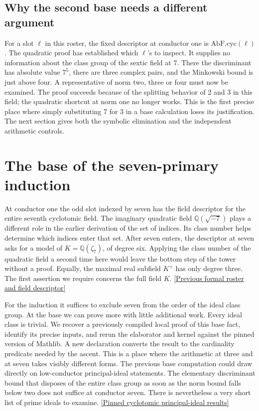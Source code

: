 \documentclass[12pt,letterpaper]{article}
\begin{document}
\subsection{Why the second base needs a different argument}
For a slot \(\ell\) in this roster, the fixed descriptor at conductor one is \(\mathrm{AbF.cyc}(\ell)\). The quadratic proof has established which \(\ell\)'s to inspect. It supplies no information about the class group of the sextic field at 7. There the discriminant has absolute value \(7^5\), there are three complex pairs, and the Minkowski bound is just above four. A representative of norm two, three or four must now be examined. The proof succeeds because of the splitting behavior of 2 and 3 in this field; the quadratic shortcut at norm one no longer works. This is the first precise place where simply substituting 7 for 3 in a base calculation loses its justification. The next section gives both the symbolic elimination and the independent arithmetic controls.


\section{The base of the seven-primary induction}
\label{sec:base-seven}

At conductor one the odd slot indexed by seven has the field descriptor for the entire seventh cyclotomic field. The imaginary quadratic field \(\mathbb Q(\sqrt{-7})\) plays a different role in the earlier derivation of the set of indices. Its class number helps determine which indices enter that set. After seven enters, the descriptor at seven asks for a model of \(K=\mathbb Q(\zeta_7)\), of degree six. Applying the class number of the quadratic field a second time here would leave the bottom step of the tower without a proof. Equally, the maximal real subfield \(K^+\) has only degree three. The first assertion we require concerns the full field \(K\). \href{https://github.com/nousentllc/riemann-hypothesis/blob/0b9ed6f42cccf214e7e196f2e129ea1e3b1b5987/research/uriel/experiments/prescribed-gap-witnesses/evidence/roster/FixedRoster.lean}{[Previous formal roster and field descriptor]}

For the induction it suffices to exclude seven from the order of the ideal class group. At the base we can prove more with little additional work. Every ideal class is trivial. We recover a previously compiled local proof of this base fact, identify its precise inputs, and rerun the elaborator and kernel against the pinned version of Mathlib. A new declaration converts the result to the cardinality predicate needed by the ascent. This is a place where the arithmetic at three and at seven takes visibly different forms. The previous base computation could draw directly on low-conductor principal-ideal statements. The elementary discriminant bound that disposes of the entire class group as soon as the norm bound falls below two does not suffice at conductor seven. There is nevertheless a very short list of prime ideals to examine. \href{https://github.com/leanprover-community/mathlib4/blob/0df444a360eaa60ab8c11dca51a86af692955474/Mathlib/NumberTheory/NumberField/Cyclotomic/PID.lean}{[Pinned cyclotomic principal-ideal results]}
\end{document}
